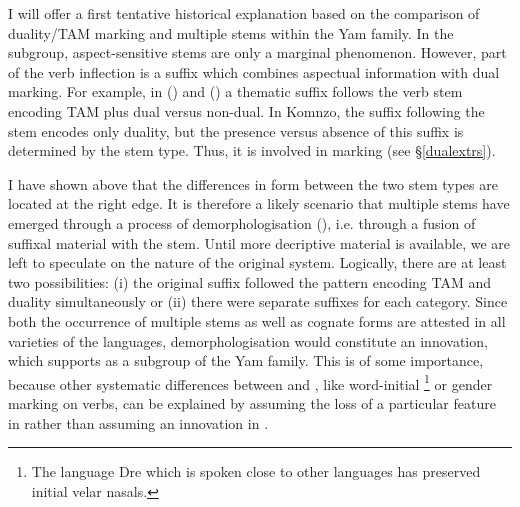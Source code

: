 I will offer a first tentative historical explanation based on the comparison of duality/TAM marking and multiple stems within the Yam family. In the  subgroup, aspect-sensitive stems are only a marginal phenomenon. However, part of the verb inflection is a suffix which combines aspectual information with dual marking. For example, in  (\citealt{Evans:2015to}) and  (\citealt{Siegel:2015bp}) a thematic suffix follows the verb stem encoding TAM plus dual versus non-dual. In Komnzo, the suffix following the stem encodes only duality, but the presence versus absence of this suffix is determined by the stem type. Thus, it is involved in marking  (see \S{}\ref{dualextrs}).%

I have shown above that the differences in form between the two stem types are located at the right edge. It is therefore a likely scenario that multiple stems have emerged through a process of demorphologisation (\citealt[154]{Hopper:1990vm}), i.e. through a fusion of suffixal material with the stem. Until more decriptive material is available, we are left to speculate on the nature of the original system. Logically, there are at least two possibilities: (i) the original suffix followed the  pattern encoding TAM and duality simultaneously or (ii) there were separate suffixes for each category. Since both the occurrence of multiple stems as well as cognate forms are attested in all varieties of the  languages, demorphologisation would constitute an innovation, which supports  as a subgroup of the Yam family. This is of some importance, because other systematic differences between  and , like word-initial  \footnote{The  language Dre which is spoken close to other  languages has preserved initial velar nasals.} or gender marking on verbs, can be explained by assuming the loss of a particular feature in  rather than assuming an innovation in .%

